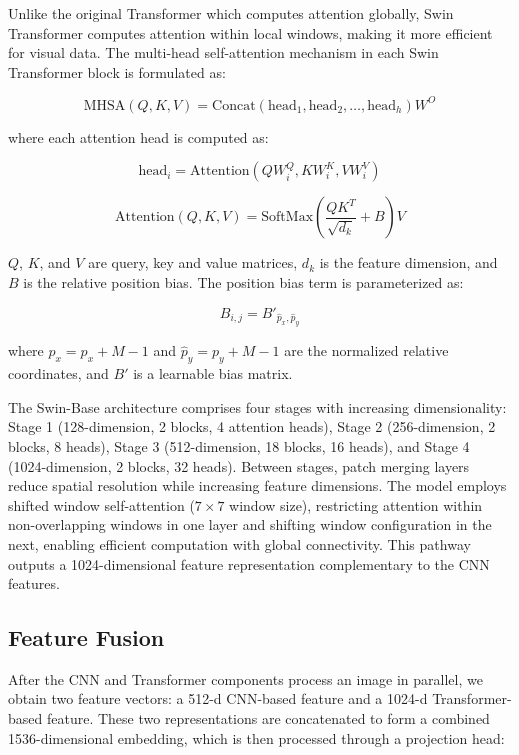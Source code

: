 \documentclass[11pt,a4paper,oneside]{report}
\begin{document}
Unlike the original Transformer which computes attention globally, Swin Transformer computes attention within local windows, making it more efficient for visual data. The multi-head self-attention mechanism in each Swin Transformer block is formulated as:

\begin{equation}
\text{MHSA}(Q, K, V) = \text{Concat}(\text{head}_1, \text{head}_2, \ldots, \text{head}_h)W^O
\end{equation}

where each attention head is computed as:

\begin{equation}
\text{head}_i = \text{Attention}(QW^Q_i, KW^K_i, VW^V_i)
\end{equation}

\begin{equation}
\text{Attention}(Q, K, V) = \text{SoftMax}\left(\frac{QK^T}{\sqrt{d_k}} + B\right)V
\end{equation}

$Q$, $K$, and $V$ are query, key and value matrices, $d_k$ is the feature dimension, and $B$ is the relative position bias. The position bias term is parameterized as:

\begin{equation}
B_{i,j} = B'_{\hat{p}_x, \hat{p}_y}
\end{equation}

where $\hat{p}_x = p_x + M - 1$ and $\hat{p}_y = p_y + M - 1$ are the normalized relative coordinates, and $B'$ is a learnable bias matrix.

The Swin-Base architecture comprises four stages with increasing dimensionality: Stage 1 (128-dimension, 2 blocks, 4 attention heads), Stage 2 (256-dimension, 2 blocks, 8 heads), Stage 3 (512-dimension, 18 blocks, 16 heads), and Stage 4 (1024-dimension, 2 blocks, 32 heads). Between stages, patch merging layers reduce spatial resolution while increasing feature dimensions. The model employs shifted window self-attention ($7 \times 7$ window size), restricting attention within non-overlapping windows in one layer and shifting window configuration in the next, enabling efficient computation with global connectivity. This pathway outputs a 1024-dimensional feature representation complementary to the CNN features.

\subsection{Feature Fusion}
\noindent\hspace{1cm}
After the CNN and Transformer components process an image in parallel, we obtain two feature vectors: a 512-d CNN-based feature and a 1024-d Transformer-based feature. These two representations are concatenated to form a combined 1536-dimensional embedding, which is then processed through a projection head:
\end{document}
